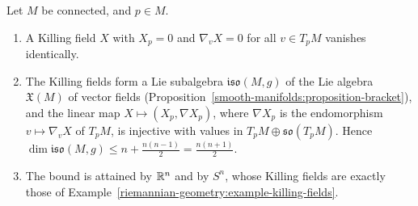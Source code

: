 \begin{theorem}\label{riemannian-geometry:theorem-killing-algebra}
Let $M$ be connected, and $p \in M$.
\begin{enumerate}
\item A Killing field $X$ with $X_p = 0$ and $\nabla_vX = 0$ for all $v \in T_pM$ vanishes identically.
\item The Killing fields form a Lie subalgebra $\mathfrak{iso}(M, g)$ of the Lie algebra $\mathfrak{X}(M)$ of vector fields
(Proposition~\ref{smooth-manifolds:proposition-bracket}), and the linear map $X \mapsto (X_p, \nabla X_p)$, where $\nabla X_p$ is the endomorphism $v \mapsto \nabla_vX$
of $T_pM$, is injective with values in $T_pM \oplus \mathfrak{so}(T_pM)$. Hence $\dim\mathfrak{iso}(M, g) \leq n + \frac{n(n-1)}{2} = \frac{n(n + 1)}{2}$.
\item The bound is attained by $\mathbb{R}^n$ and by $S^n$, whose Killing fields are exactly those of Example~\ref{riemannian-geometry:example-killing-fields}.
\end{enumerate}
\end{theorem}

